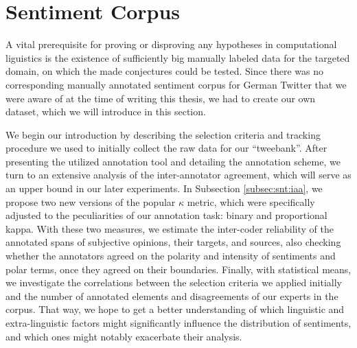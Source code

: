 

\section{Sentiment Corpus}\label{sec:snt:corpus}

A vital prerequisite for proving or disproving any hypotheses in
computational liguistics is the existence of sufficiently big manually
labeled data for the targeted domain, on which the made conjectures
could be tested.  Since there was no corresponding manually annotated
sentiment corpus for German Twitter that we were aware of at the time
of writing this thesis, we had to create our own dataset, which we
will introduce in this section.

We begin our introduction by describing the selection criteria and
tracking procedure we used to initially collect the raw data for our
``tweebank''.  After presenting the utilized annotation tool and
detailing the annotation scheme, we turn to an extensive analysis of
the inter-annotator agreement, which will serve as an upper bound in
our later experiments.  In Subsection \ref{subsec:snt:iaa}, we propose
two new versions of the popular $\kappa$ metric, which were
specifically adjusted to the peculiarities of our annotation task:
binary and proportional kappa.  With these two measures, we estimate
the inter-coder reliability of the annotated spans of subjective
opinions, their targets, and sources, also checking whether the
annotators agreed on the polarity and intensity of sentiments and
polar terms, once they agreed on their boundaries.  Finally, with
statistical means, we investigate the correlations between the
selection criteria we applied initially and the number of annotated
elements and disagreements of our experts in the corpus.  That way, we
hope to get a better understanding of which linguistic and
extra-linguistic factors might significantly influence the
distribution of sentiments, and which ones might notably exacerbate
their analysis.

